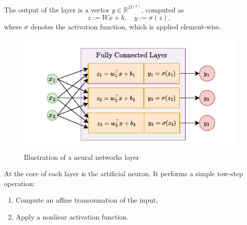 The output of the layer is a vector \( y \in \mathbb{R}^{D^{(L)}} \), computed as
\[
z := Wx + b, \quad y := \sigma(z),
\]
where \( \sigma \) denotes the activation function, which is applied element-wise.

\begin{figure}[H]
    \centering
    \includegraphics[width=0.7\linewidth]{Abschlussarbeit/Pictures/Layer_outp.pdf}
    \caption{Illustration of a neural networks layer}
    \label{fig:layer}
\end{figure}

At the core of each layer is the artificial neuron.
It performs a simple tow-step operation:
\begin{enumerate}
    \item Compute an affine transormation of the input,
    \item Apply a nonliear activation function.
\end{enumerate}








